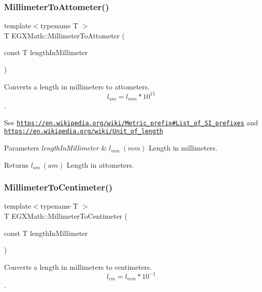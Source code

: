 \subsubsection{\texorpdfstring{Millimeter\+To\+Attometer()}{MillimeterToAttometer()}}
{\footnotesize\ttfamily template$<$typename T $>$ \\
T E\+G\+X\+Math\+::\+Millimeter\+To\+Attometer (\begin{DoxyParamCaption}\item[{const T}]{length\+In\+Millimeter }\end{DoxyParamCaption})}



Converts a length in millimeters to attometers. \[ l_{am}=l_{mm} * 10^{15} \]. 

See \href{https://en.wikipedia.org/wiki/Metric_prefix#List_of_SI_prefixes}{\tt https\+://en.\+wikipedia.\+org/wiki/\+Metric\+\_\+prefix\#\+List\+\_\+of\+\_\+\+S\+I\+\_\+prefixes} and \href{https://en.wikipedia.org/wiki/Unit_of_length}{\tt https\+://en.\+wikipedia.\+org/wiki/\+Unit\+\_\+of\+\_\+length} 
\begin{DoxyParams}{Parameters}
{\em length\+In\+Millimeter} & $ l_{mm}\ (mm)$ Length in millimeters. \\
\hline
\end{DoxyParams}
\begin{DoxyReturn}{Returns}
$ l_{am}\ (am)$ Length in attometers. 
\end{DoxyReturn}
\mbox{\label{group___e_g_x_math-_conversions-_length_conversions-_millimeter-_s_i_gaa77c48215c6c4f46394025af4cb26ead}} 
\subsubsection{\texorpdfstring{Millimeter\+To\+Centimeter()}{MillimeterToCentimeter()}}
{\footnotesize\ttfamily template$<$typename T $>$ \\
T E\+G\+X\+Math\+::\+Millimeter\+To\+Centimeter (\begin{DoxyParamCaption}\item[{const T}]{length\+In\+Millimeter }\end{DoxyParamCaption})}



Converts a length in millimeters to centimeters. \[ l_{cm}=l_{mm} * 10^{-1} \]. 

